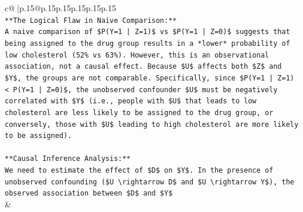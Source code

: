 \documentclass{article}
\begin{document}
{\begin{supertabular}{c@{$\;$}|p{.15\linewidth}@{}p{.15\linewidth}p{.15\linewidth}p{.15\linewidth}p{.15\linewidth}p{.15\linewidth}}
{{{\\ 
\texttt{**The Logical Flaw in Naive Comparison:**} \\
\texttt{A naive comparison of \$P(Y=1 | Z=1)\$ vs \$P(Y=1 | Z=0)\$ suggests that being assigned to the drug group results in a *lower* probability of low cholesterol (52\% vs 63\%). However, this is an observational association, not a causal effect. Because \$U\$ affects both \$Z\$ and \$Y\$, the groups are not comparable. Specifically, since \$P(Y=1 | Z=1) < P(Y=1 | Z=0)\$, the unobserved confounder \$U\$ must be negatively correlated with \$Y\$ (i.e., people with \$U\$ that leads to low cholesterol are less likely to be assigned to the drug group, or conversely, those with \$U\$ leading to high cholesterol are more likely to be assigned).} \\
\\ 
\texttt{**Causal Inference Analysis:**} \\
\texttt{We need to estimate the effect of \$D\$ on \$Y\$. In the presence of unobserved confounding (\$U \textbackslash{}rightarrow D\$ and \$U \textbackslash{}rightarrow Y\$), the observed association between \$D\$ and \$Y\$} \\
            }
        }
    }
    & \\ \\


\end{supertabular}}
\end{document}
